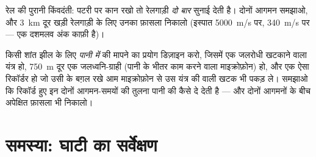\begin{exercise}[$\star\star$]\label{exo:g7:sound-production:11}
रेल की पुरानी किंवदंती: पटरी पर कान रखो तो रेलगाड़ी \emph{दो बार}
सुनाई देती है। दोनों आगमन समझाओ, और \qty{3}{km} दूर खड़ी रेलगाड़ी के
लिए उनका फ़ासला निकालो (इस्पात \qty{5000}{m/s} पर,  \qty{340}{m/s}
पर --- एक दशमलव अंक काफ़ी है)।
\end{exercise}

\begin{exercise}[$\star\star\star$]\label{exo:g7:sound-production:12}
किसी शांत झील के लिए \emph{पानी में}  की  मापने का प्रयोग
डिज़ाइन करो, जिसमें एक जलरोधी खटकाने वाला यंत्र हो, \qty{750}{m} दूर
एक जलध्वनि-ग्राही (पानी के भीतर काम करने वाला माइक्रोफ़ोन) हो, और एक
ऐसा रिकॉर्डर हो जो उसी के बग़ल रखे आम माइक्रोफ़ोन से उस यंत्र की 
वाली खटक भी पकड़ ले। समझाओ कि रिकॉर्ड हुए इन दोनों आगमन-समयों की
तुलना पानी की  कैसे दे देती है --- और दोनों आगमनों के बीच अपेक्षित
फ़ासला भी निकालो।
\end{exercise}

\section{समस्या: घाटी का सर्वेक्षण}

